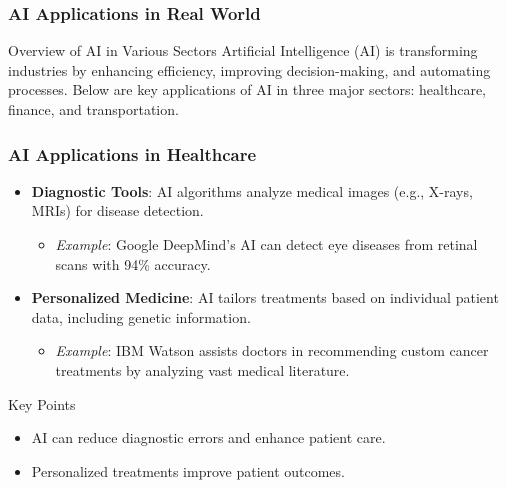 \documentclass[aspectratio=169]{beamer}
\begin{document}
\begin{frame}[fragile]
    \frametitle{AI Applications in Real World}
    \begin{block}{Overview of AI in Various Sectors}
        Artificial Intelligence (AI) is transforming industries by enhancing efficiency, improving decision-making, and automating processes. 
        Below are key applications of AI in three major sectors: healthcare, finance, and transportation.
    \end{block}
\end{frame}

\begin{frame}[fragile]
    \frametitle{AI Applications in Healthcare}
    \begin{itemize}
        \item \textbf{Diagnostic Tools}: AI algorithms analyze medical images (e.g., X-rays, MRIs) for disease detection.
        \begin{itemize}
            \item \textit{Example}: Google DeepMind’s AI can detect eye diseases from retinal scans with 94\% accuracy.
        \end{itemize}
        
        \item \textbf{Personalized Medicine}: AI tailors treatments based on individual patient data, including genetic information.
        \begin{itemize}
            \item \textit{Example}: IBM Watson assists doctors in recommending custom cancer treatments by analyzing vast medical literature.
        \end{itemize}
    \end{itemize}
    \begin{block}{Key Points}
        \begin{itemize}
            \item AI can reduce diagnostic errors and enhance patient care.
            \item Personalized treatments improve patient outcomes.
        \end{itemize}
    \end{block}
\end{frame}
\end{document}
